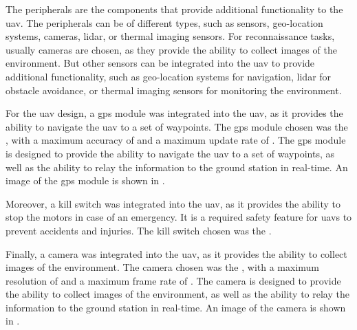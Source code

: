 The peripherals are the components that provide additional functionality to the \gls{uav}. The peripherals can be of different types, such as sensors, geo-location systems, cameras, lidar, or thermal imaging sensors. For reconnaissance tasks, usually cameras are chosen, as they provide the ability to collect images of the environment. But other sensors can be integrated into the \gls{uav} to provide additional functionality, such as geo-location systems for navigation, lidar for obstacle avoidance, or thermal imaging sensors for monitoring the environment.

For the \gls{uav} design, a \gls{gps} module was integrated into the \gls{uav}, as it provides the ability to navigate the \gls{uav} to a set of waypoints. The \gls{gps} module chosen was the , with a maximum accuracy of  and a maximum update rate of . The \gls{gps} module is designed to provide the ability to navigate the \gls{uav} to a set of waypoints, as well as the ability to relay the information to the ground station in real-time. An image of the \gls{gps} module is shown in .


Moreover, a kill switch was integrated into the \gls{uav}, as it provides the ability to stop the motors in case of an emergency. It is a required safety feature for \glspl{uav} to prevent accidents and injuries. The kill switch chosen was the .


Finally, a camera was integrated into the \gls{uav}, as it provides the ability to collect images of the environment. The camera chosen was the , with a maximum resolution of  and a maximum frame rate of . The camera is designed to provide the ability to collect images of the environment, as well as the ability to relay the information to the ground station in real-time. An image of the camera is shown in .


